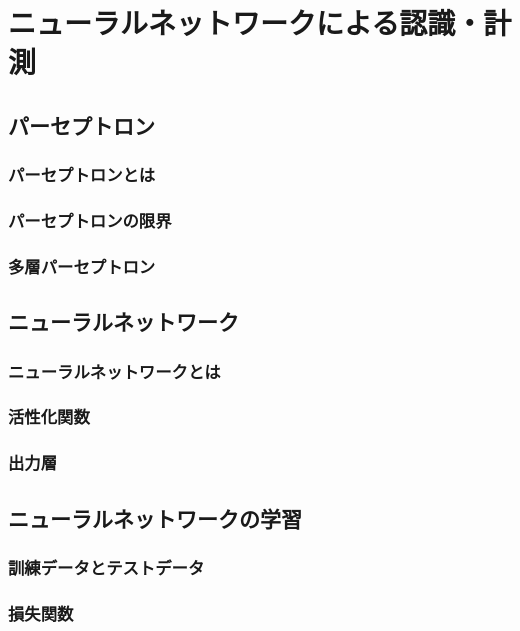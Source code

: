 \chapter{ニューラルネットワークによる認識・計測}

\section{パーセプトロン}

\subsection{パーセプトロンとは}

\subsection{パーセプトロンの限界}

\subsection{多層パーセプトロン}


\section{ニューラルネットワーク}

\subsection{ニューラルネットワークとは}

\subsection{活性化関数}

\subsection{出力層}


\section{ニューラルネットワークの学習}

\subsection{訓練データとテストデータ}

\subsection{損失関数}


